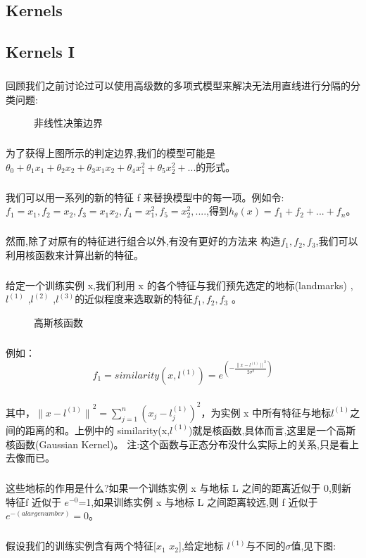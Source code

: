 \documentclass{article}
\begin{document}
\begin{CJK}{UTF8}{gbsn}
\section{Kernels}
\subsection{Kernels I}
\subparagraph{}
回顾我们之前讨论过可以使用高级数的多项式模型来解决无法用直线进行分隔的分类问题:
\begin{figure}[H]
\label{fig:730}
\caption{非线性决策边界}
\end{figure}
\subparagraph{}
为了获得上图所示的判定边界,我们的模型可能是$\theta_0+\theta_1x_1+\theta_2x_2+\theta_3x_1x_2+\theta_4x_1^2+\theta_5x_2^2+...$的形式。
\subparagraph{}
我们可以用一系列的新的特征 f 来替换模型中的每一项。例如令:
$f_1=x_1,f_2=x_2,f_3=x_1x_2,f_4=x_1^2,f_5=x_2^2,....$,得到$h_\theta(x)=f_1+f_2+...+f_n$。
\subparagraph{}
然而,除了对原有的特征进行组合以外,有没有更好的方法来
构造$f_1,f_2,f_3$,我们可以利用核函数来计算出新的特征。
\subparagraph{}
给定一个训练实例 x,我们利用 x 的各个特征与我们预先选定的地标(landmarks) ,$l^{(1)}$ ,$l^{(2)}$ ,$l^{(3)}$的近似程度来选取新的特征$f_1,f_2,f_3$ 。
\begin{figure}[H]
\label{fig:731}
\caption{高斯核函数}
\end{figure}
\subparagraph{}
例如：
\begin{equation}
f_1=similarity(x,l^{(1)})=e^{(-\frac{{\parallel{x-l^{(1)}}\parallel}^2}{2{\sigma}^2})}
\end{equation}
\subparagraph{}
其中，${\parallel{x-l^{(1)}}\parallel}^2=\sum_{j=1}^n(x_j-l_j^{(1)})^2$，为实例 x 中所有特征与地标$l^{(1)}$之间的距离的和。上例中的 similarity(x,$l^{(1)}$)就是核函数,具体而言,这里是一个高斯核函数(Gaussian Kernel)。 注:这个函数与正态分布没什么实际上的关系,只是看上去像而已。
\subparagraph{}
这些地标的作用是什么?如果一个训练实例 x 与地标 L 之间的距离近似于 0,则新特征f 近似于 $e^{-0}$=1,如果训练实例 x 与地标 L 之间距离较远,则 f 近似于 $e^{-(a large number)}=0$。
\begin{figure}[H]
\label{fig:732}
\end{figure}
\subparagraph{}
假设我们的训练实例含有两个特征[$x_1$ $x_2$],给定地标 $l^{(1)}$与不同的$\sigma$值,见下图:
\begin{figure}[H]
\label{fig:733}
\end{figure}

\end{CJK}
\end{document}
